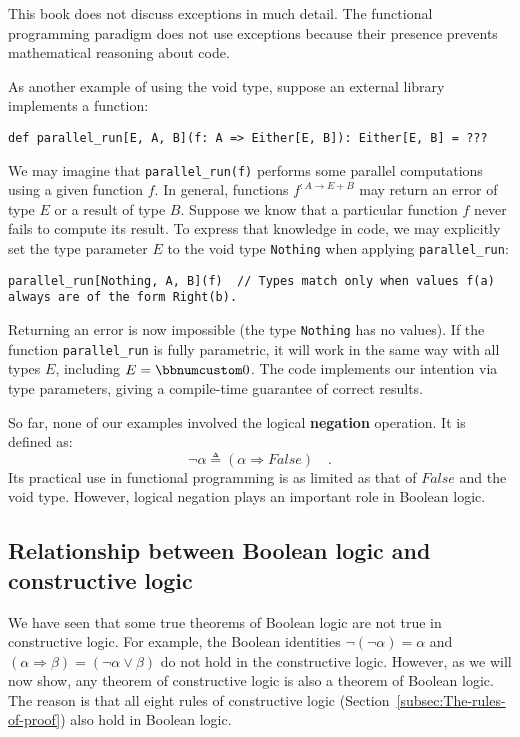 This book does not discuss exceptions in much detail. The functional
programming paradigm does not use exceptions because their presence
prevents mathematical reasoning about code.

As another example of using the void type, suppose an external library
implements a function:
\begin{lstlisting}
def parallel_run[E, A, B](f: A => Either[E, B]): Either[E, B] = ???
\end{lstlisting}
We may imagine that \lstinline!parallel_run(f)! performs some parallel
computations using a given function $f$. In general, functions $f^{:A\rightarrow E+B}$
may return an error of type $E$ or a result of type $B$. Suppose
we know that a particular function $f$ never fails to compute its
result. To express that knowledge in code, we may explicitly set the
type parameter $E$ to the void type \lstinline!Nothing! when applying
\lstinline!parallel_run!:
\begin{lstlisting}
parallel_run[Nothing, A, B](f)  // Types match only when values f(a) always are of the form Right(b). 
\end{lstlisting}
Returning an error is now impossible (the type \lstinline!Nothing!
has no values). If the function \lstinline!parallel_run! is fully
parametric, it will work in the same way with all types $E$, including
$E=\bbnum 0$. The code implements our intention via type parameters,
giving a compile-time guarantee of correct results.

So far, none of our examples involved the logical \textbf{negation}
operation. It is defined as:
\[
\neg\alpha\triangleq(\alpha\Rightarrow False)\quad.
\]
Its practical use in functional programming is as limited as that
of $False$ and the void type. However, logical negation plays an
important role in Boolean logic.

\subsection{Relationship between Boolean logic and constructive logic\label{subsec:Relationship-between-Boolean} }

We have seen that some true theorems of Boolean logic are not true
in constructive logic. For example, the Boolean identities $\neg\left(\neg\alpha\right)=\alpha$
and $\left(\alpha\Rightarrow\beta\right)=(\neg\alpha\vee\beta)$ do
not hold in the constructive logic. However, as we will now show,
any theorem of constructive logic is also a theorem of Boolean logic.
The reason is that all eight rules of constructive logic (Section~\ref{subsec:The-rules-of-proof})
also hold in Boolean logic.


